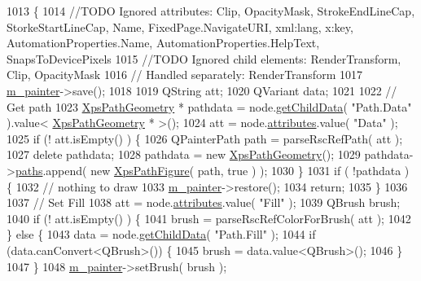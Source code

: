 \begin{DoxyCode}
1013 \{
1014     \textcolor{comment}{//TODO Ignored attributes: Clip, OpacityMask, StrokeEndLineCap, StorkeStartLineCap, Name,
       FixedPage.NavigateURI, xml:lang, x:key, AutomationProperties.Name, AutomationProperties.HelpText, SnapsToDevicePixels}
1015     \textcolor{comment}{//TODO Ignored child elements: RenderTransform, Clip, OpacityMask}
1016     \textcolor{comment}{// Handled separately: RenderTransform}
1017     \hyperlink{classXpsHandler_a2db77df5312274e6f1d7e274b45c9d21}{m\_painter}->save();
1018 
1019     QString att;
1020     QVariant data;
1021 
1022     \textcolor{comment}{// Get path}
1023     \hyperlink{structXpsPathGeometry}{XpsPathGeometry} * pathdata = node.\hyperlink{classXpsRenderNode_a7b201a5c93024bcb63ebb6e913a010f8}{getChildData}( \textcolor{stringliteral}{"Path.Data"} ).value< 
      \hyperlink{structXpsPathGeometry}{XpsPathGeometry} * >();
1024     att = node.\hyperlink{classXpsRenderNode_a7f6fca2e06dd119e7eb20139af6c8477}{attributes}.value( \textcolor{stringliteral}{"Data"} );
1025     \textcolor{keywordflow}{if} (! att.isEmpty() ) \{
1026         QPainterPath path = parseRscRefPath( att );
1027         \textcolor{keyword}{delete} pathdata;
1028         pathdata = \textcolor{keyword}{new} \hyperlink{structXpsPathGeometry}{XpsPathGeometry}();
1029         pathdata->\hyperlink{structXpsPathGeometry_a2623aacaaadb1ac2b4c7cb2c5ded4b7b}{paths}.append( \textcolor{keyword}{new} \hyperlink{structXpsPathFigure}{XpsPathFigure}( path, \textcolor{keyword}{true} ) );
1030     \}
1031     \textcolor{keywordflow}{if} ( !pathdata ) \{
1032         \textcolor{comment}{// nothing to draw}
1033         \hyperlink{classXpsHandler_a2db77df5312274e6f1d7e274b45c9d21}{m\_painter}->restore();
1034         \textcolor{keywordflow}{return};
1035     \}
1036 
1037     \textcolor{comment}{// Set Fill}
1038     att = node.\hyperlink{classXpsRenderNode_a7f6fca2e06dd119e7eb20139af6c8477}{attributes}.value( \textcolor{stringliteral}{"Fill"} );
1039     QBrush brush;
1040     \textcolor{keywordflow}{if} (! att.isEmpty() ) \{
1041         brush = parseRscRefColorForBrush( att );
1042     \} \textcolor{keywordflow}{else} \{
1043         data = node.\hyperlink{classXpsRenderNode_a7b201a5c93024bcb63ebb6e913a010f8}{getChildData}( \textcolor{stringliteral}{"Path.Fill"} );
1044         \textcolor{keywordflow}{if} (data.canConvert<QBrush>()) \{
1045             brush = data.value<QBrush>();
1046         \}
1047     \}
1048     \hyperlink{classXpsHandler_a2db77df5312274e6f1d7e274b45c9d21}{m\_painter}->setBrush( brush );

\end{DoxyCode}
